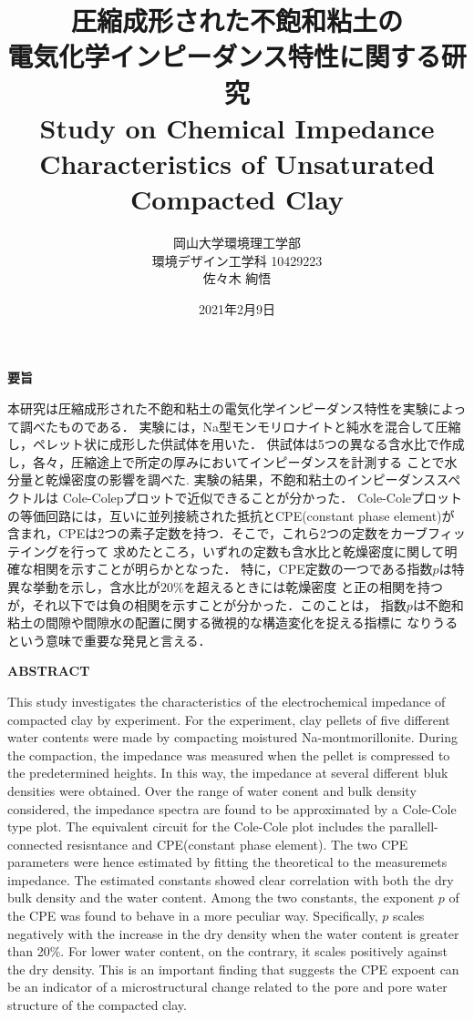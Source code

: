 ﻿\documentclass[11pt,a4j]{mybook2}
\title{
\vspace{20mm}
圧縮成形された不飽和粘土の\\
電気化学インピーダンス特性に関する研究
\\
\vspace{5mm}
Study on Chemical Impedance Characteristics 
of Unsaturated Compacted Clay
\vspace{60mm}
}
\date{2021年2月9日}
\author{
	\vspace{40mm}
岡山大学環境理工学部\\
環境デザイン工学科 10429223\\
	佐々木 絢悟
}
\begin{document}
\maketitle
\begin{center}
\begin{minipage}{15cm}
\begin{center}
	{\bf 要旨}
\end{center}
本研究は圧縮成形された不飽和粘土の電気化学インピーダンス特性を実験によって調べたものである．
実験には，Na型モンモリロナイトと純水を混合して圧縮し，ペレット状に成形した供試体を用いた．
供試体は5つの異なる含水比で作成し，各々，圧縮途上で所定の厚みにおいてインピーダンスを計測する
ことで水分量と乾燥密度の影響を調べた. 実験の結果，不飽和粘土のインピーダンススペクトルは
Cole-Colepプロットで近似できることが分かった．
Cole-Coleプロットの等価回路には，互いに並列接続された抵抗とCPE(constant phase element)が
含まれ，CPEは2つの素子定数を持つ．そこで，これら2つの定数をカーブフィッテイングを行って
求めたところ，いずれの定数も含水比と乾燥密度に関して明確な相関を示すことが明らかとなった．
特に，CPE定数の一つである指数$p$は特異な挙動を示し，含水比が$20\%$を超えるときには乾燥密度
と正の相関を持つが，それ以下では負の相関を示すことが分かった．このことは，
指数$p$は不飽和粘土の間隙や間隙水の配置に関する微視的な構造変化を捉える指標に
なりうるという意味で重要な発見と言える．
	\vspace{15mm}
\begin{center}
	{\bf ABSTRACT}
\end{center}
This study investigates the characteristics of the electrochemical impedance of compacted clay by experiment.
For the experiment, clay pellets of five different water contents were made by compacting moistured Na-montmorillonite.
During the compaction, the impedance was measured when the pellet is compressed to the predetermined heights. 
In this way, the impedance at several different bluk densities were obtained.
Over the range of water conent and bulk density considered,  the impedance spectra are found to be 
approximated by a Cole-Cole type plot. The equivalent circuit for the Cole-Cole plot includes the parallell-connected 
resisntance and CPE(constant phase element). The two CPE parameters were hence estimated by fitting the theoretical 
to the measuremets impedance. The estimated constants showed clear correlation with both the dry bulk density 
and the water content. Among the two constants, the exponent $p$ of the CPE was found to behave in a more peculiar way. 
Specifically, $p$ scales negatively with the increase in the dry density when the water content is greater than 20\%. 
For lower water content, on the contrary, it scales positively against the dry density. 
This is an important finding that suggests the CPE expoent can be an indicator of a microstructural change 
related to the pore and pore water structure of the compacted clay.
\end{minipage}
\end{center}
\end{document}
